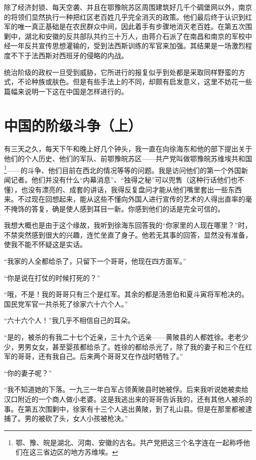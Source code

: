 \documentclass[10pt]{book}
\begin{document}
除了经济封锁、每天空袭、并且在鄂豫皖苏区周围建筑好几千个碉堡网以外，南京的将领们显然执行一种把红区老百姓几乎完全消灭的政策。他们最后终于认识到红军的唯一真正基础是在农民群众中间，因此着手有步骤地消灭老百姓。在第五次围剿中，湖北和安徽的反共部队共约三十万人，由蒋介石派了在南昌和南京的军校中经一年反共宣传思想灌输的，受到法西斯训练的军官来加强。其结果是一场激烈程度不下于法西斯对西班牙的侵略的内战。

统治阶级的政权一旦受到威胁，它所进行的报复似乎到处都是采取同样野蛮的方式，不论种族或肤色。但是有些手法上的不同，却颇有启发意义，这里不妨花一些篇幅来说明一下这在中国是怎样进行的。

\section{中国的阶级斗争（上）}

有三天之久，每天下午和晚上好几个钟头，我一直在向徐海东和他的部下提出关于他们的个人历史、他们的军队、前鄂豫皖苏区——共产党叫做鄂豫皖苏维埃共和国\footnote{鄂、豫、皖是湖北、河南、安徽的古名。共产党把这三个名字连在一起称呼他们在这三省边区的地方苏维埃。}——的斗争、他们目前在西北的情况等等的问题。我是访问他们的第一个外国新闻记者。他们并没有什么“内幕消息”、“独得之秘”可以兜售（这种行话他们也不懂），也没有漂亮的、成套的讲话，我得反复盘问才能从他们嘴里套出一些东西来。不过现在回想起来，能从这些不懂向外国人进行宣传的艺术的人得出直率的毫不掩饰的答复，确是使人感到耳目一新。你感到他们的话是完全可信的。

我想大概也是由于这个缘故，我听到徐海东回答我的“你家里的人现在哪里？”时，不禁突然感到很大的兴趣，连忙坐直了身子。他若无其事的回答，显然没有准备，使我不能不怀疑这是实话。

“我家的人全都给杀了，只留下一个哥哥，他现在四方面军。”

“你是说在打仗的时候打死的？”

“哦，不是！我的哥哥只有三个是红军。其余的都是汤恩伯和夏斗寅将军枪决的。国民党军官一共杀死了徐家六十六个人。”

“六十六个人！”我几乎不相信自己的耳朵。

“是的，被杀的有我二十七个近亲，三十九个远亲——黄陂县的人都姓徐。老老少少，男男女女，甚至婴孩都给杀了。姓徐的都给杀光了，除了我的妻子和三个在红军的哥哥，还有我自己。后来两个哥哥又在作战时牺牲了。”

“你的妻子呢？”

“我不知道她的下落。一九三一年白军占领黄陂县时她被俘。后来我听说她被卖给汉口附近的一个商人做小老婆。这是我逃出来的哥哥告诉我的，还有其他人被杀的事。在第五次围剿中，徐家有十三个人逃出黄陂，到了礼山县。但是在那里都被逮捕了。男的被砍了头，女人小孩被枪决。”
\end{document}

